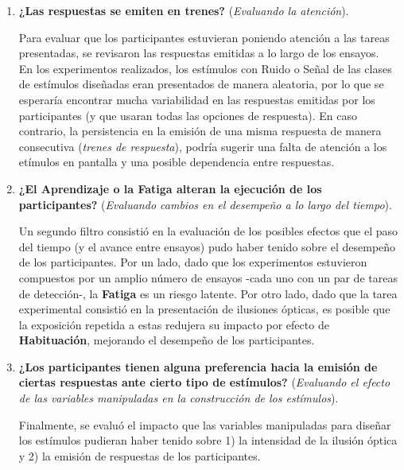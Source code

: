 \begin{enumerate}
	\item \textbf{¿Las respuestas se emiten en trenes?} (\textit{Evaluando la atención}).

Para evaluar que los participantes estuvieran poniendo atención a las tareas presentadas, se revisaron las respuestas emitidas a lo largo de los ensayos.\\

En los experimentos realizados, los estímulos con Ruido o Señal de las clases de estímulos diseñadas eran presentados de manera aleatoria, por lo que se esperaría encontrar mucha variabilidad en las respuestas emitidas por los participantes (y que usaran todas las opciones de respuesta). En caso contrario, la persistencia en la emisión de una misma respuesta de manera consecutiva (\textit{trenes de respuesta}), podría sugerir una falta de atención a los etímulos en pantalla y una posible dependencia entre respuestas.\\

	\item \textbf{¿El Aprendizaje o la Fatiga alteran la ejecución de los participantes?}  (\textit{Evaluando cambios en el desempeño a lo largo del tiempo}).

Un segundo filtro consistió en la evaluación de los posibles efectos que el paso del tiempo (y el avance entre ensayos) pudo haber tenido sobre el desempeño de los participantes. Por un lado, dado que los experimentos estuvieron compuestos por un amplio número de ensayos -cada uno con un par de tareas de detección-, la \textbf{Fatiga} es un riesgo latente. Por otro lado, dado que la tarea experimental consistió en la presentación de ilusiones ópticas, es posible que la exposición repetida a estas redujera su impacto por efecto de \textbf{Habituación}, mejorando el desempeño de los participantes.\\

	\item \textbf{¿Los participantes tienen alguna preferencia hacia la emisión de ciertas respuestas ante cierto tipo de estímulos?} (\textit{Evaluando el efecto de las variables manipuladas en la construcción de los estímulos}).

Finalmente, se evaluó el impacto que las variables manipuladas para diseñar los estímulos pudieran haber tenido sobre 1) la intensidad de la ilusión óptica y 2) la emisión de respuestas de los participantes.\\
\end{enumerate}

